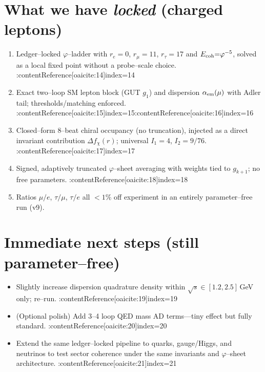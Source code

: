 \documentclass[12pt]{article}
\begin{document}
\section*{What we have \emph{locked} (charged leptons)}
\begin{enumerate}
\item Ledger--locked $\varphi$--ladder with $r_e{=}0$, $r_\mu{=}11$, $r_\tau{=}17$ and $E_{\rm coh}{=}\varphi^{-5}$, solved as a local fixed point without a probe--scale choice. :contentReference[oaicite:14]{index=14}
\item Exact two--loop SM lepton block (GUT $g_1$) and dispersion $\alpha_{\rm em}(\mu)$ with Adler tail; thresholds/matching enforced. :contentReference[oaicite:15]{index=15}:contentReference[oaicite:16]{index=16}
\item Closed--form $8$--beat chiral occupancy (no truncation), injected as a direct invariant contribution $\Delta f_\chi(r)$; universal $I_1{=}4$, $I_2{=}9/76$. :contentReference[oaicite:17]{index=17}
\item Signed, adaptively truncated $\varphi$--sheet averaging with weights tied to $g_{k+1}$; no free parameters. :contentReference[oaicite:18]{index=18}
\item Ratios $\mu/e$, $\tau/\mu$, $\tau/e$ all $<1\%$ off experiment in an entirely parameter--free run (v9).
\end{enumerate}
\section*{Immediate next steps (still parameter--free)}
\begin{itemize}
\item Slightly increase dispersion quadrature density within $\sqrt{s}\!\in\![1.2,2.5]\,$GeV only; re--run. :contentReference[oaicite:19]{index=19}
\item (Optional polish) Add 3--4 loop QED mass AD terms---tiny effect but fully standard. :contentReference[oaicite:20]{index=20}
\item Extend the same ledger--locked pipeline to quarks, gauge/Higgs, and neutrinos to test sector coherence under the same invariants and $\varphi$--sheet architecture. :contentReference[oaicite:21]{index=21}
\end{itemize}
\end{document}
